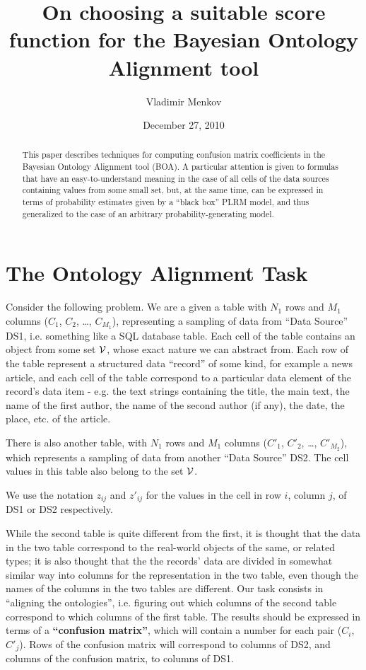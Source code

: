\documentclass[12pt]{article}
\begin{document}
\title{On choosing a suitable score function for the Bayesian Ontology Alignment tool}
\date{December 27, 2010}
\author{Vladimir Menkov}

\maketitle

\begin{abstract}
This paper describes techniques for computing confusion matrix
coefficients in the Bayesian Ontology Alignment tool (BOA). A
particular attention is given to formulas that have an
easy-to-understand meaning in the case of all cells of the data
sources containing values from some small set, but, at the same time,
can be expressed in terms of probability estimates given by a ``black
box'' PLRM model, and thus generalized to the case of an arbitrary
probability-generating model.
\end{abstract}

\section{The Ontology Alignment Task}

Consider the following problem. We are a given a table with $N_1$ rows
and $M_1$ columns ($C_1$, $C_2$, \dots, $C_{M_1}$), representing a
sampling of data from ``Data Source'' DS1, i.e. something like a SQL
database table. Each cell of the table contains an object from some
set $\cal{V}$, whose exact nature we can abstract from. Each row of
the table represent a structured data ``record'' of some kind, for
example a news article, and each cell of the table correspond to a
particular data element of the record's data item - e.g. the text
strings containing the title, the main text, the name of the first
author, the name of the second author (if any), the date, the place,
etc. of the article. 

There is also another table, with $N_1$ rows and $M_1$ columns
($C'_1$, $C'_2$, \dots, $C'_{M_2}$), which represents a sampling of
data from another ``Data Source'' DS2. The cell values in this table
also belong to the set $\cal{V}$.

We use the notation $z_{ij}$ and $z'_{ij}$ for the values in the cell
in row $i$, column $j$, of DS1 or DS2 respectively.

While the second table is quite different from the first, it is
thought that the data in the two table correspond to the real-world
objects of the same, or related types; it is also thought that the the
records' data are divided in somewhat similar way into columns for the
representation in the two table, even though the names of the columns
in the two tables are different. Our task consists in ``aligning the
ontologies'', i.e. figuring out which columns of the second table
correspond to which columns of the first table. The results should be
expressed in terms of a {\bf ``confusion matrix''}, which will contain a
number for each pair ($C_i$, $C'_j$). Rows of the confusion matrix
will correspond to columns of DS2, and columns of the confusion
matrix, to columns of DS1.
\end{document}
